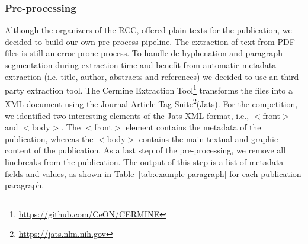 

\subsubsection{Pre-processing}
\label{sec:prepro}
Although the organizers of the RCC, offered plain texts for the publication, we decided to build our own pre-process pipeline.
The extraction of text from PDF files is still an error prone process. To handle de-hyphenation and paragraph segmentation during extraction time and benefit from automatic metadata extraction (i.e. title, author, abstracts and references) we decided to use an third party extraction tool.
The Cermine Extraction Tool\footnote{\url{https://github.com/CeON/CERMINE}}\cite{tkaczyk2015cermine} transforms the files into a XML document using the Journal Article Tag Suite\footnote{\url{https://jats.nlm.nih.gov}}(Jats).
For the competition, we identified two interesting elements of the Jats XML format, i.e., $<$front$>$ and $<$body$>$. The $<$front$>$ element contains the metadata of the publication, whereas the $<$body$>$ contains the main textual and graphic content of the publication.
As a last step of the pre-processing, we remove all linebreaks from the publication.
The output of this step is a list of metadata fields and values, as shown in Table~\ref{tab:example-paragraph} for each publication paragraph.


